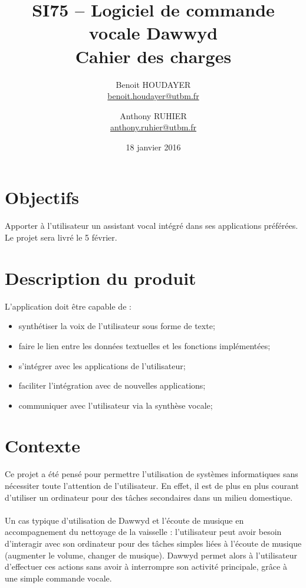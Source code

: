 \documentclass[12pt]{article}
\title{\textbf{SI75 -- Logiciel de commande vocale Dawwyd\\[0.5em]Cahier des charges}}
\author{Benoit HOUDAYER \\ \href{mailto:benoit.houdayer@utbm.fr}{benoit.houdayer@utbm.fr}
\and Anthony RUHIER \\ \href{mailto:anthony.ruhier@utbm.fr}{anthony.ruhier@utbm.fr}}
\date{18 janvier 2016}
\begin{document}
    \maketitle
    \thispagestyle{empty}
    \vspace{4em}
    \tableofcontents

    \afterpage{\cfoot{\thepage}}
    \newpage


	\section{Objectifs}

Apporter à l'utilisateur un assistant vocal intégré dans ses applications
préférées. Le projet sera livré le 5 février.

	\section{Description du produit}

L'application doit être capable de :
\begin{itemize}
    \item synthétiser la voix de l'utilisateur sous forme de texte;
    \item faire le lien entre les données textuelles et les fonctions
        implémentées;
    \item s'intégrer avec les applications de l'utilisateur;
    \item faciliter l'intégration avec de nouvelles applications;
    \item communiquer avec l'utilisateur via la synthèse vocale;
\end{itemize}

    \section{Contexte}

Ce projet a été pensé pour permettre l'utilisation de systèmes informatiques
sans nécessiter toute l'attention de l'utilisateur. En effet, il est de plus en
plus courant d'utiliser un ordinateur pour des tâches secondaires dans un
milieu domestique.

\paragraph{}
Un cas typique d'utilisation de Dawwyd et l'écoute de musique
en accompagnement du nettoyage de la vaisselle : l'utilisateur peut avoir
besoin d'interagir avec son ordinateur pour des tâches simples liées à l'écoute
de musique (augmenter le volume, changer de musique).
Dawwyd permet alors à l'utilisateur d'effectuer ces actions sans avoir à
interrompre son activité principale, grâce à une simple commande vocale.
\end{document}
